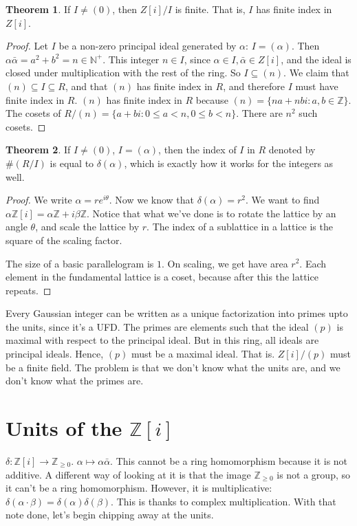 \documentclass{book}
\newcommand{\N}{\ensuremath{\mathbb{N}}}
\newcommand{\Z}{\ensuremath{\mathbb{Z}}}
\theoremstyle{definition}
\newtheorem{theorem}{Theorem}
\begin{document}
\begin{theorem}
If $I \neq (0)$, then $Z[i]/I$ is finite. That is, $I$ has finite index in $Z[i]$.
\end{theorem}
\begin{proof}
Let $I$ be a non-zero principal ideal generated by $\alpha$: 
$I = (\alpha)$. Then $\alpha \bar \alpha = a^2 + b^2 = n \in \N^+$.
This integer $n \in I$, since $\alpha \in I, \bar \alpha \in Z[i]$, and the ideal
is closed under multiplication with the rest of the ring. So $I \subseteq (n)$.
We claim that $(n) \subseteq I \subseteq R$, and that $(n)$ has finite index
in $R$, and therefore $I$ must have finite index in $R$. $(n)$ has finite
index in $R$ because $(n) = \{ n a + n b i : a, b \in \Z \}$. The cosets
of $R/(n) = \{ a + bi : 0 \leq a < n, 0 \leq b < n \}$. There are $n^2$ such
cosets.
\end{proof}

\begin{theorem}
If $I \neq (0)$, $I = (\alpha)$, then the index of $I$ in $R$ denoted by
$\#(R/I)$ is equal to $\delta(\alpha)$,
which is exactly how it works for the integers as well.
\end{theorem}
\begin{proof}
We write $\alpha = re^{i \theta}$. Now we know that $\delta(\alpha) = r^2$.
We want to find $\alpha \Z[i] = \alpha \Z + i \beta \Z$. Notice that
what we've done is to rotate the lattice by an angle $\theta$, and scale the lattice by $r$.
The index of a sublattice in a lattice is the square of the scaling factor. 

The size of a basic parallelogram is $1$. On scaling, we get have area $r^2$.
Each element in the fundamental lattice is a coset, because after this
the lattice repeats.
\end{proof}

Every Gaussian integer can be written as a unique factorization into primes
upto the units, since it's a UFD. The primes are elements such that the ideal $(p)$ is maximal
with respect to the principal ideal. But in this ring, all ideals are principal
ideals. Hence, $(p)$ must be a maximal ideal. That is. $Z[i]/(p)$ must be
a finite field. The problem is that we don't know what the units are, and we don't
know what the primes are. 

\section{Units of the $\Z[i]$}
$\delta: \Z[i] \rightarrow \Z_{\geq 0}$. $\alpha \mapsto \alpha \bar \alpha$. This cannot
be a ring homomorphism because it is not additive. A different way of looking
at it is that the image $\Z_{\geq 0}$ is not a group, so it can't be
a ring homomorphism. However, it is multiplicative: $\delta(\alpha \cdot \beta) = \delta(\alpha) \delta(\beta)$.
This is thanks to complex multiplication. With that note done,
let's begin chipping away at the units.
\end{document}
